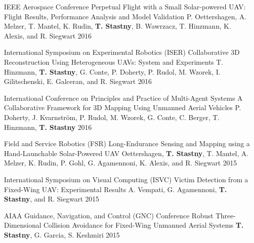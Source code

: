 \begin{cventries}
\begin{cvnumlist}
\item \cvpubentry
	{IEEE Aerospace Conference} %
	{Perpetual Flight with a Small Solar-powered UAV: Flight Results, Performance Analysis and Model Validation} %
	{P. Oettershagen, A. Melzer, T. Mantel, K. Rudin, \textbf{T. Stastny}, B. Wawrzacz, T. Hinzmann, K. Alexis, and R. Siegwart} %
	{} %
	{2016} %
	{} %
	{} %


\item \cvpubentry
	{International Symposium on Experimental Robotics (ISER)} %
	{Collaborative 3D Reconstruction Using Heterogeneous UAVs: System and Experiments} %
	{T. Hinzmann, \textbf{T. Stastny}, G. Conte, P. Doherty, P. Rudol, M. Wzorek, I. Gilitschenski, E. Galceran, and R. Siegwart} %
	{} %
	{2016} %
	{} %
	{} %

\item \cvpubentry
	{International Conference on Principles and Practice of Multi-Agent Systems} %
	{A Collaborative Framework for 3D Mapping Using Unmanned Aerial Vehicles} %
	{P. Doherty, J. Kvarnstr{\"o}m, P. Rudol, M. Wzorek, G. Conte, C. Berger, T. Hinzmann, \textbf{T. Stastny}} %
	{} %
	{2016} %
	{} %
	{} %

\item \cvpubentry
	{Field and Service Robotics (FSR)} %
	{Long-Endurance Sensing and Mapping using a Hand-Launchable Solar-Powered UAV} %
	{Oettershagen, \textbf{T. Stastny}, T. Mantel, A. Melzer, K. Rudin, P. Gohl, G. Agamennoni, K. Alexis, and R. Siegwart} %
	{} %
	{2015} %
	{} %
	{} %

\item \cvpubentry
	{International Symposium on Visual Computing (ISVC)} %
	{Victim Detection from a Fixed-Wing UAV: Experimental Results} %
	{A. Vempati, G. Agamennoni, \textbf{T. Stastny}, and R. Siegwart} %
	{} %
	{2015} %
	{} %
	{} %
	
\item \cvpubentry
	{AIAA Guidance, Navigation, and Control (GNC) Conference} %
	{Robust Three-Dimensional Collision Avoidance for Fixed-Wing Unmanned Aerial Systems} %
	{\textbf{T. Stastny}, G. Garcia, S. Keshmiri} %
	{} %
	{2015} %
	{} %
	{} %
	

\end{cvnumlist}
\end{cventries}
